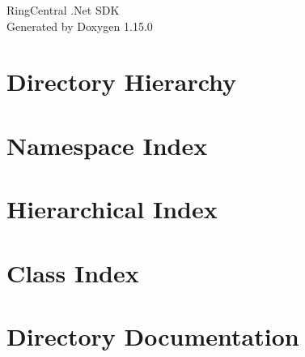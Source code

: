 \documentclass[twoside]{book}
\newcommand{\+}{\discretionary{\mbox{\scriptsize$\hookleftarrow$}}{}{}}
\newcommand{\clearemptydoublepage}{%
    \newpage{\pagestyle{empty}\cleardoublepage}%
  }
\begin{document}
  \raggedbottom
    \hypersetup{pageanchor=false,
                bookmarksnumbered=true,
                pdfencoding=unicode
               }
  \begin{titlepage}
  \vspace*{7cm}
  \begin{center}%
  {\Large Ring\+Central .\+Net SDK}\\
  \vspace*{1cm}
  {\large Generated by Doxygen 1.15.0}\\
  \end{center}
  \end{titlepage}
  \clearemptydoublepage
  \tableofcontents
  \clearemptydoublepage
  \hypersetup{pageanchor=true}

\chapter{Directory Hierarchy}

\chapter{Namespace Index}

\chapter{Hierarchical Index}

\chapter{Class Index}

\chapter{Directory Documentation}






\end{document}
